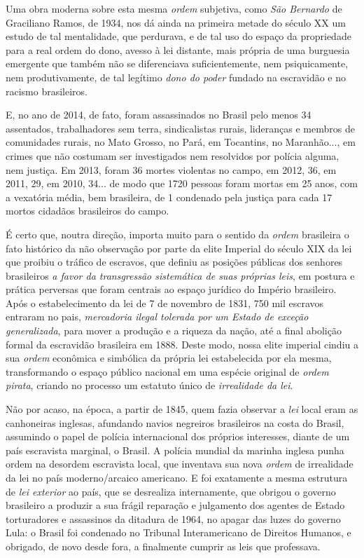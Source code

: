 Uma obra moderna sobre esta mesma \emph{ordem} subjetiva, como \emph{São
Bernardo} de Graciliano Ramos, de 1934, nos dá ainda na primeira metade
do século XX um estudo de tal mentalidade, que perdurava, e de tal uso
do espaço da propriedade para a real ordem do dono, avesso à lei
distante, mais própria de uma burguesia emergente que também não se
diferenciava suficientemente, nem psiquicamente, nem produtivamente, de
tal legítimo \emph{dono do poder} fundado na escravidão e no racismo
brasileiros.

E, no ano de 2014, de fato, foram assassinados no Brasil pelo menos 34
assentados, trabalhadores sem terra, sindicalistas rurais, lideranças e
membros de comunidades rurais, no Mato Grosso, no Pará, em Tocantins, no
Maranhão..., em crimes que não costumam ser investigados nem resolvidos
por polícia alguma, nem justiça. Em 2013, foram 36 mortes violentas no
campo, em 2012, 36, em 2011, 29, em 2010, 34... de modo que 1720 pessoas
foram mortas em 25 anos, com a vexatória média, bem brasileira, de 1
condenado pela justiça para cada 17 mortos cidadãos brasileiros do
campo.

É certo que, noutra direção, importa muito para o sentido da
\emph{ordem} brasileira o fato histórico da não observação por parte da
elite Imperial do século XIX da lei que proibiu o tráfico de escravos,
que definiu as posições públicas dos senhores brasileiros \emph{a favor
da transgressão sistemática de suas próprias leis}, em postura e prática
perversas que foram centrais ao espaço jurídico do Império brasileiro.
Após o estabelecimento da lei de 7 de novembro de 1831, 750 mil escravos
entraram no pais, \emph{mercadoria ilegal tolerada por um Estado de
exceção generalizada}, para mover a produção e a riqueza da nação, até a
final abolição formal da escravidão brasileira em 1888. Deste modo,
nossa elite imperial cindiu a sua \emph{ordem} econômica e simbólica da
própria lei estabelecida por ela mesma, transformando o espaço público
nacional em uma espécie original de \emph{ordem pirata}, criando no
processo um estatuto único de \emph{irrealidade da lei}.

Não por acaso, na época, a partir de 1845, quem fazia observar a
\emph{lei} local eram as canhoneiras inglesas, afundando navios
negreiros brasileiros na costa do Brasil, assumindo o papel de polícia
internacional dos próprios interesses, diante de um país escravista
marginal, o Brasil. A polícia mundial da marinha inglesa punha ordem na
desordem escravista local, que inventava sua nova \emph{ordem} de
irrealidade da lei no país moderno/arcaico americano. E foi exatamente a
mesma estrutura de \emph{lei exterior} ao país, que se desrealiza
internamente, que obrigou o governo brasileiro a produzir a sua frágil
reparação e julgamento dos agentes de Estado torturadores e assassinos
da ditadura de 1964, no apagar das luzes do governo Lula: o Brasil foi
condenado no Tribunal Interamericano de Direitos Humanos, e obrigado, de
novo desde fora, a finalmente cumprir as leis que professava.

